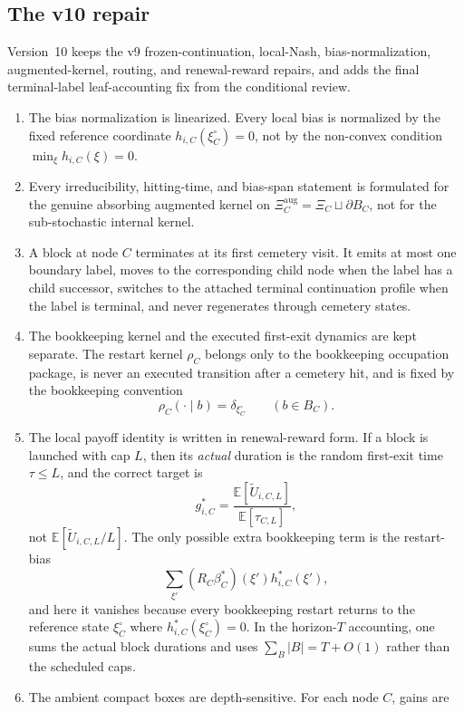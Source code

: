 \documentclass[12pt]{article}
\theoremstyle{definition}
\newcommand{\E}{\mathbb{E}}
\newcommand{\1}{\mathbf{1}}
\begin{document}
\subsection{The v10 repair}

Version~10 keeps the v9 frozen-continuation, local-Nash, bias-normalization,
augmented-kernel, routing, and renewal-reward repairs, and adds the final
terminal-label leaf-accounting fix from the conditional review.

\begin{enumerate}[label=\textnormal{(\arabic*)},leftmargin=2.4em]
\item The bias normalization is linearized. Every local bias is normalized by the
fixed reference coordinate $h_{i,C}(\xi_C^\circ)=0$, not by the non-convex
condition $\min_\xi h_{i,C}(\xi)=0$.
\item Every irreducibility, hitting-time, and bias-span statement is formulated
for the genuine absorbing augmented kernel on
$\Xi_C^{\mathrm{aug}}=\Xi_C\sqcup\partial B_C$, not for the sub-stochastic
internal kernel.
\item A block at node $C$ terminates at its first cemetery visit. It emits at
most one boundary label, moves to the corresponding child node when the label
has a child successor, switches to the attached terminal continuation profile
when the label is terminal, and never regenerates through cemetery states.
\item The bookkeeping kernel and the executed first-exit dynamics are kept
separate. The restart kernel $\rho_C$ belongs only to the bookkeeping occupation
package, is never an executed transition after a cemetery hit, and is fixed by
the bookkeeping convention
\[
\rho_C(\cdot\mid b)=\delta_{\xi_C^\circ}
\qquad (b\in B_C).
\]
\item The local payoff identity is written in renewal-reward form. If a block is
launched with cap $L$, then its \emph{actual} duration is the random first-exit
time $\tau\le L$, and the correct target is
\[
g_{i,C}^*
=
\frac{\E[\widetilde U_{i,C,L}]}{\E[\tau_{C,L}]},
\]
not $\E[\widetilde U_{i,C,L}/L]$. The only possible extra bookkeeping term is the
restart-bias
\[
\sum_{\xi'}(R_C\beta_C^*)(\xi')h_{i,C}^*(\xi'),
\]
and here it vanishes because every bookkeeping restart returns to the reference
state $\xi_C^\circ$ where $h_{i,C}^*(\xi_C^\circ)=0$. In the horizon-$T$
accounting, one sums the actual block durations and uses
$\sum_B |B| = T + O(1)$ rather than the scheduled caps.
\item The ambient compact boxes are depth-sensitive. For each node $C$, gains are

\end{enumerate}
\end{document}
